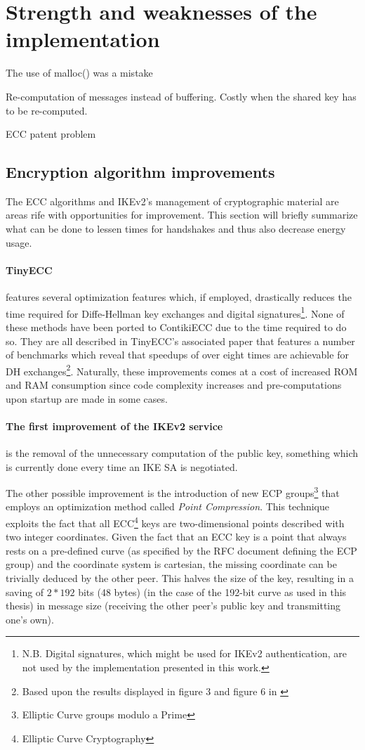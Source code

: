\documentclass[final,a4paper,twoside,11pt,onecolumn]{report}
\begin{document}
\section{Strength and weaknesses of the implementation}
The use of malloc() was a mistake

Re-computation of messages instead of buffering. Costly when the shared key has to be re-computed.
 
ECC patent problem


\subsection{Encryption algorithm improvements}
\label{sec:ecc-improvements}
The ECC algorithms and IKEv2's management of cryptographic material are areas rife with opportunities for improvement. This section will briefly summarize what can be done to lessen times for handshakes and thus also decrease energy usage.

\paragraph{TinyECC} features several optimization features which, if employed, drastically reduces the time required for Diffe-Hellman key exchanges and digital signatures\footnote{N.B. Digital signatures, which might be used for IKEv2 authentication, are not used by the implementation presented in this work.}. None of these methods have been ported to ContikiECC due to the time required to do so. They are all described in TinyECC's associated paper\cite{liu2008tinyecc} that features a number of benchmarks which reveal that speedups of over eight times are achievable for DH exchanges\footnote{Based upon the results displayed in figure 3 and figure 6 in \cite{liu2008tinyecc}}. Naturally, these improvements comes at a cost of increased ROM and RAM consumption since code complexity increases and pre-computations upon startup are made in some cases.

\paragraph{The first improvement of the IKEv2 service} is the removal of the unnecessary computation of the public key, something which is currently done every time an IKE SA is negotiated.

The other possible improvement is the introduction of new ECP groups\footnote{Elliptic Curve groups modulo a Prime} that employs an optimization method called \emph{Point Compression}. This technique exploits the fact that all ECC\footnote{Elliptic Curve Cryptography} keys are two-dimensional points described with two integer coordinates. Given the fact that an ECC key is a point that always rests on a pre-defined curve (as specified by the RFC document defining the ECP group) and the coordinate system is cartesian, the missing coordinate can be trivially deduced by the other peer. This halves the size of the key, resulting in a saving of $2*192$ bits (48 bytes) (in the case of the 192-bit curve as used in this thesis) in message size (receiving the other peer's public key and transmitting one's own).
\end{document}
